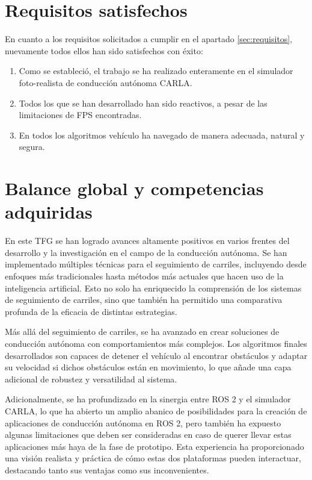 \section{Requisitos satisfechos}
\label{sec:requisitos_satisfechos}

En cuanto a los requisitos solicitados a cumplir en el apartado \ref{sec:requisitos}, nuevamente todos ellos han sido satisfechos con éxito:
\begin{enumerate}
	\item Como se estableció, el trabajo se ha realizado enteramente en el simulador foto-realista de conducción autónoma CARLA.
	\item Todos los que se han desarrollado han sido reactivos, a pesar de las limitaciones de \ac{FPS} encontradas.
	\item En todos los algoritmos vehículo ha navegado de manera adecuada, natural y segura.
\end{enumerate}

\section{Balance global y competencias adquiridas}
\label{sec:balance_global_competencias_adquiridas}


En este \ac{TFG} se han logrado avances altamente positivos en varios frentes del desarrollo y la investigación en el campo de la conducción autónoma. Se han implementado múltiples técnicas para el seguimiento de carriles, incluyendo desde enfoques más tradicionales hasta métodos más actuales que hacen uso de la inteligencia artificial. Esto no solo ha enriquecido la comprensión de los sistemas de seguimiento de carriles, sino que también ha permitido una comparativa profunda de la eficacia de distintas estrategias.

\bigskip

Más allá del seguimiento de carriles, se ha avanzado en crear soluciones de conducción autónoma con comportamientos más complejos. Los algoritmos finales desarrollados son capaces de detener el vehículo al encontrar obstáculos y adaptar su velocidad si dichos obstáculos están en movimiento, lo que añade una capa adicional de robustez y versatilidad al sistema.

\bigskip

Adicionalmente, se ha profundizado en la sinergia entre ROS 2 y el simulador CARLA, lo que ha abierto un amplio abanico de posibilidades para la creación de aplicaciones de conducción autónoma en ROS 2, pero también ha expuesto algunas limitaciones que deben ser consideradas en caso de querer llevar estas aplicaciones más haya de la fase de prototipo. Esta experiencia ha proporcionado una visión realista y práctica de cómo estas dos plataformas pueden interactuar, destacando tanto sus ventajas como sus inconvenientes.

